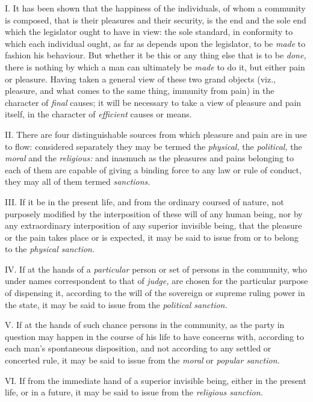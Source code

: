 \documentclass[12pt]{report}
\begin{document}
I. It has been shown that the happiness of the individuals, of whom a
community is composed, that is their pleasures and their security, is
the end and the sole end which the legislator ought to have in view: the
sole standard, in conformity to which each individual ought, as far as
depends upon the legislator, to be \emph{made} to fashion his behaviour.
But whether it be this or any thing else that is to be \emph{done,}
there is nothing by which a man can ultimately be \emph{made} to do it,
but either pain or pleasure. Having taken a general view of these two
grand objects (viz., pleasure, and what comes to the same thing,
immunity from pain) in the character of \emph{final} causes; it will be
necessary to take a view of pleasure and pain itself, in the character
of \emph{efficient} causes or means.

II. There are four distinguishable sources from which pleasure and pain
are in use to flow: considered separately they may be termed the
\emph{physical,} the \emph{political,} the \emph{moral} and the
\emph{religious:} and inasmuch as the pleasures and pains belonging to
each of them are capable of giving a binding force to any law or rule of
conduct, they may all of them termed \emph{sanctions.} \emph{}

III. If it be in the present life, and from the ordinary coursed of
nature, not purposely modified by the interposition of these will of any
human being, nor by any extraordinary interposition of any superior
invisible being, that the pleasure or the pain takes place or is
expected, it may be said to issue from or to belong to the
\emph{physical sanction.} \emph{}

IV. If at the hands of a \emph{particular} person or set of persons in
the community, who under names correspondent to that of \emph{judge,}
are chosen for the particular purpose of dispensing it, according to the
will of the sovereign or supreme ruling power in the state, it may be
said to issue from the \emph{political sanction.} \emph{}

V. If at the hands of such chance persons in the community, as the party
in question may happen in the course of his life to have concerns with,
according to each man's spontaneous disposition, and not according to
any settled or concerted rule, it may be said to issue from the
\emph{moral} or \emph{popular sanction.} \emph{}

VI. If from the immediate hand of a superior invisible being, either in
the present life, or in a future, it may be said to issue from the
\emph{religious sanction.} \emph{}
\end{document}
